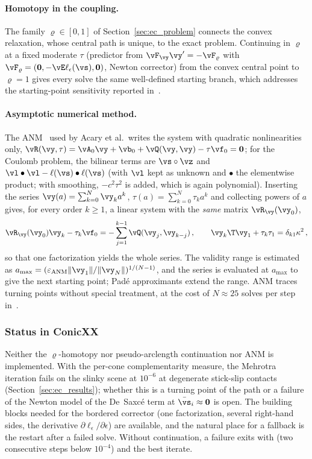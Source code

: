 \paragraph{Homotopy in the coupling.} The family $\varrho \in [0, 1]$ of Section~\ref{sec:ec_problem} connects the convex relaxation, whose central path is unique, to the exact problem. Continuing in $\varrho$ at a fixed moderate $\tau$ (predictor from $\vF_{\vy}\vy' = -\vF_{\varrho}$ with $\vF_{\varrho} = (\mathbf{0}, -\vE\ell_\epsilon(\vs), \mathbf{0})$, Newton corrector) from the convex central point to $\varrho = 1$ gives every solve the same well-defined starting branch, which addresses the starting-point sensitivity reported in~\cite{Acary2026}.
%
\paragraph{Asymptotic numerical method.} The ANM~\cite{Cochelin1994} used by Acary et al.\ writes the system with quadratic nonlinearities only, $\vR(\vy, \tau) = \vA_0\vy + \vb_0 + \vQ(\vy, \vy) - \tau\vf_0 = \mathbf{0}$; for the Coulomb problem, the bilinear terms are $\vs\circ\vz$ and $\vl\bullet\vl - \ell(\vs)\bullet\ell(\vs)$ (with $\vl$ kept as unknown and $\bullet$ the elementwise product; with smoothing, $-c^2\tau^2$ is added, which is again polynomial). Inserting the series $\vy(a) = \sum_{k=0}^N \vy_k a^k$, $\tau(a) = \sum_{k=0}^N \tau_k a^k$ and collecting powers of $a$ gives, for every order $k \geq 1$, a linear system with the \emph{same} matrix $\vR_{\vy}(\vy_0)$,
%
\begin{equation}
	\vR_{\vy}(\vy_0)\vy_k - \tau_k\vf_0 = -\sum_{j=1}^{k-1}\vQ(\vy_j, \vy_{k-j}) \, , \qquad \vy_k\T\vy_1 + \tau_k\tau_1 = \delta_{k1}\kappa^2 \, ,
\end{equation}
%
so that one factorization yields the whole series. The validity range is estimated as $a_{\max} = (\varepsilon_{\mathrm{ANM}}\|\vy_1\|/\|\vy_N\|)^{1/(N-1)}$, and the series is evaluated at $a_{\max}$ to give the next starting point; Pad\'e approximants extend the range. ANM traces turning points without special treatment, at the cost of $N \approx 25$ solves per step in~\cite{Acary2026}.
%
\subsubsection{Status in ConicXX}\label{sec:ec_cont_status}
%
Neither the $\varrho$-homotopy nor pseudo-arclength continuation nor ANM is implemented. With the per-cone complementarity measure, the Mehrotra iteration fails on the slinky scene at $10^{-6}$ at degenerate stick-slip contacts (Section~\ref{sec:ec_results}); whether this is a turning point of the path or a failure of the Newton model of the De~Saxc\'e term at $\bar{\vs}_i \approx \mathbf{0}$ is open. The building blocks needed for the bordered corrector (one factorization, several right-hand sides, the derivative $\partial\ell_\epsilon/\partial\epsilon$) are available, and the natural place for a fallback is the restart after a failed solve. Without continuation, a failure exits with  (two consecutive steps below $10^{-4}$) and the best iterate.
%
